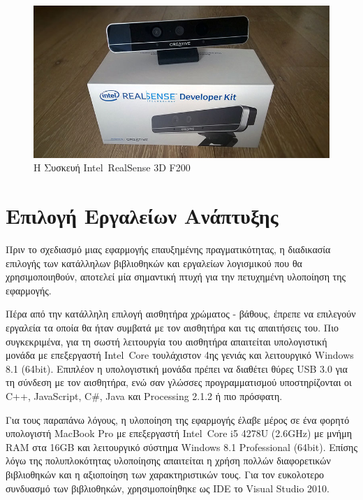 \begin{figure}[H]
    \centering
    \includegraphics[scale=0.3, angle=0]{Files/Figures/RealSenseCamera.jpg}
    \caption[Η Συσκευή Intel\textregistered\ RealSense\texttrademark{} 3D F200]{Η Συσκευή Intel\textregistered\ RealSense\texttrademark{} 3D F200}
    \label{fig:realsense}
\end{figure}



\section{Επιλογή Εργαλείων Ανάπτυξης}


Πριν το σχεδιασμό μιας εφαρμογής επαυξημένης πραγματικότητας, η διαδικασία επιλογής των κατάλληλων βιβλιοθηκών και εργαλείων λογισμικού που θα χρησιμοποιηθούν, αποτελεί μία σημαντική πτυχή για την πετυχημένη υλοποίηση της εφαρμογής. 

Πέρα από την κατάλληλη επιλογή αισθητήρα χρώματος - βάθους,
έπρεπε να επιλεγούν εργαλεία τα οποία θα ήταν συμβατά με τον αισθητήρα και τις απαιτήσεις του. Πιο συγκεκριμένα, για τη σωστή λειτουργία του αισθητήρα απαιτείται υπολογιστική μονάδα με επεξεργαστή Intel\textregistered\ Core\texttrademark{} τουλάχιστον 4ης γενιάς και λειτουργικό Windows 8.1 (64bit). Επιπλέον η υπολογιστική μονάδα πρέπει να διαθέτει θύρες USB 3.0 για τη σύνδεση με τον αισθητήρα, ενώ σαν γλώσσες προγραμματισμού υποστηρίζονται οι C++, JavaScript, C\#, Java και Processing 2.1.2 ή πιο πρόσφατη.


Για τους παραπάνω λόγους, η υλοποίηση της εφαρμογής έλαβε μέρος σε ένα φορητό υπολογιστή  MacBook Pro με επεξεργαστή Intel\textregistered\ Core\texttrademark{} i5 4278U (2.6GHz) με μνήμη RAM στα 16GB και λειτουργικό σύστημα Windows 8.1 Professional (64bit). Επίσης λόγω της πολυπλοκότητας υλοποίησης απαιτείται η χρήση πολλών διαφορετικών βιβλιοθηκών και η αξιοποίηση των χαρακτηριστικών τους. Για τον ευκολοτερο συνδυασμό των βιβλιοθηκών, χρησιμοποίηθηκε ως IDE το Visual Studio 2010.


